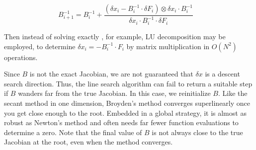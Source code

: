 \documentclass{article}
\begin{document}
\[
B_{i+1}^{-1} = B_i^{-1} + \frac{(\delta x_i - B_i^{-1} \cdot \delta F_i) \otimes \delta x_i \cdot B_i^{-1}}{\delta x_i \cdot B_i^{-1} \cdot \delta F_i} \quad 
\]

Then instead of solving exactly , for example, LU decomposition may be employed, to determine $\delta x_i = -B_i^{-1} \cdot F_i$ by matrix multiplication in $O(N^2)$ operations. 


Since $B$ is not the exact Jacobian, we are not guaranteed that $\delta x$ is a descent search direction. Thus, the line search algorithm can fail to return a suitable step if $B$ wanders far from the true Jacobian. In this case, we reinitialize $B$. Like the secant method in one dimension, Broyden’s method converges superlinearly once you get close enough to the root. Embedded in a global strategy, it is almost as robust as Newton’s method and often needs far fewer function evaluations to determine a zero. Note that the final value of $B$ is not always close to the true Jacobian at the root, even when the method converges.







\end{document}
